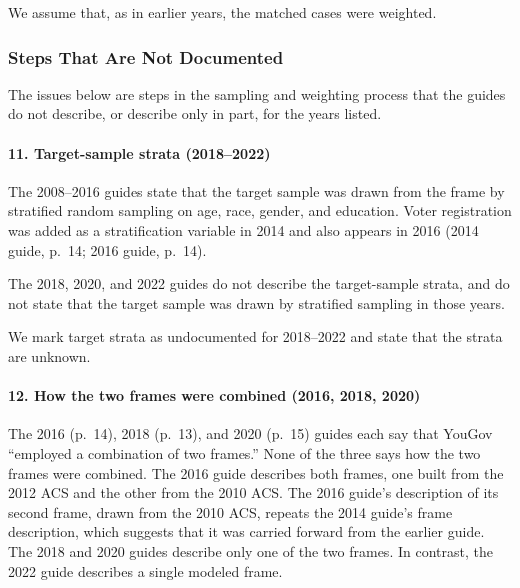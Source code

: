 \documentclass[12pt]{article}
\begin{document}
We assume that, as in earlier years, the matched cases were weighted.

\subsubsection*{Steps That Are Not Documented}

The issues below are steps in the sampling and weighting process that the guides do not describe, or describe only in part, for the years listed.

\paragraph*{11. Target-sample strata (2018--2022)}
The 2008--2016 guides state that the target sample was drawn from the frame by stratified random sampling on age, race, gender, and education. Voter registration was added as a stratification variable in 2014 and also appears in 2016 (2014 guide, p.~14; 2016 guide, p.~14).

The 2018, 2020, and 2022 guides do not describe the target-sample strata, and do not state that the target sample was drawn by stratified sampling in those years.

We mark target strata as undocumented for 2018--2022 and state that the strata are unknown.

\paragraph*{12. How the two frames were combined (2016, 2018, 2020)}
The 2016 (p.~14), 2018 (p.~13), and 2020 (p.~15) guides each say that YouGov ``employed a combination of two frames.'' None of the three says how the two frames were combined. The 2016 guide describes both frames, one built from the 2012 ACS and the other from the 2010 ACS. The 2016 guide's description of its second frame, drawn from the 2010 ACS, repeats the 2014 guide's frame description, which suggests that it was carried forward from the earlier guide. The 2018 and 2020 guides describe only one of the two frames. In contrast, the 2022 guide describes a single modeled frame.


\end{document}

